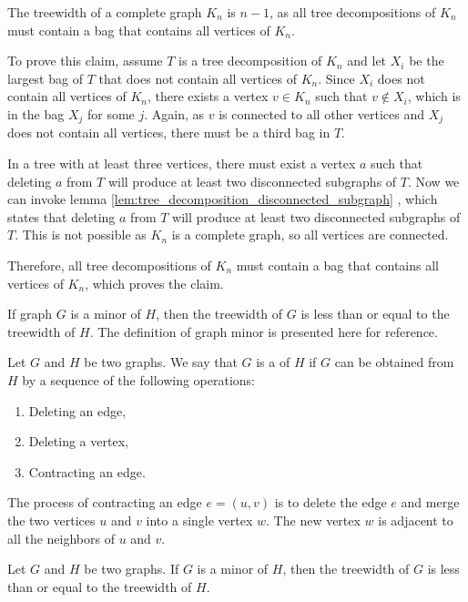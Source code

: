 \begin{example}
	The treewidth of a complete graph $K_n$ is $n-1$, as all tree decompositions of $K_n$ must contain a bag that contains all vertices of $K_n$.

	To prove this claim, assume $T$ is a tree decomposition of $K_n$ and let $X_i$ be the largest bag of $T$ that does not contain all vertices of $K_n$. 
	Since $X_i$ does not contain all vertices of $K_n$, there exists a vertex $v \in K_n$ such that $v \notin X_i$, which is in the bag $X_j$ for some $j$. Again, as $v$ is connected to all other vertices and $X_j$ does not contain all vertices, there must be a third bag in $T$. 

	In a tree with at least three vertices, there must exist a vertex $a$ such that deleting $a$ from $T$ will produce at least two disconnected subgraphs of $T$.
	Now we can invoke lemma \ref{lem:tree_decomposition_disconnected_subgraph} , which states that deleting $a$ from $T$ will produce at least two disconnected subgraphs of $T$. This is not possible as $K_n$ is a complete graph, so all vertices are connected. 

	Therefore, all tree decompositions of $K_n$ must contain a bag that contains all vertices of $K_n$, which proves the claim.
\end{example}

If graph $G$ is a minor of $H$, then the treewidth of $G$ is less than or equal to the treewidth of $H$.
The definition of graph minor is presented here for reference.

\begin{definition}
	Let $G$ and $H$ be two graphs. We say that $G$ is a  of $H$ if $G$ can be obtained from $H$ by a sequence of the following operations:
	\begin{enumerate}
		\item Deleting an edge,
		\item Deleting a vertex,
		\item Contracting an edge.
	\end{enumerate}
	The process of contracting an edge $e = (u, v)$ is to delete the edge $e$ and merge the two vertices $u$ and $v$ into a single vertex $w$. The new vertex $w$ is adjacent to all the neighbors of $u$ and $v$.
\end{definition}

\begin{lemma}\label{lem:minor_treewidth}
	Let $G$ and $H$ be two graphs. If $G$ is a minor of $H$, then the treewidth of $G$ is less than or equal to the treewidth of $H$.
\end{lemma}

